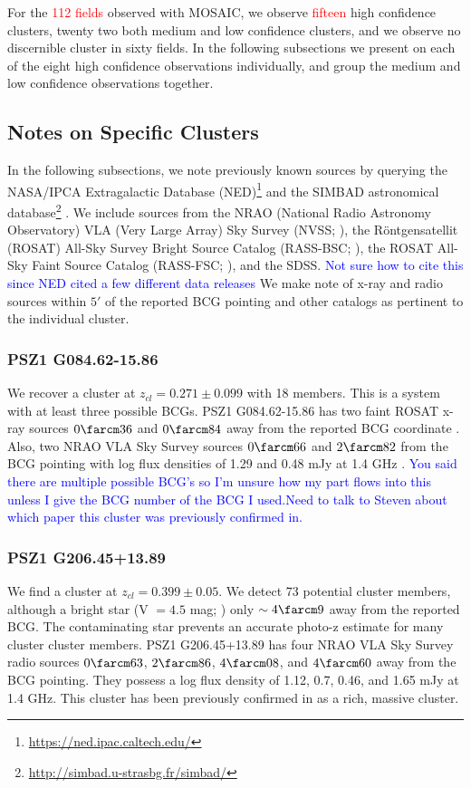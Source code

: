 \documentclass[apj, revtex4-1]{emulateapj}
\newcommand{\editorial}[1]{\textcolor{red}{#1}}
\newcommand{\peditorial}[1]{\textcolor{blue}{#1}}
\begin{document}
For the \editorial{112 fields} observed with MOSAIC, we observe \editorial{fifteen} high confidence clusters, twenty two both medium and low confidence clusters, and we observe no discernible cluster in sixty fields. In the following subsections we present on each of the eight high confidence observations individually, and group the medium and low confidence observations together.

\subsection{Notes on Specific Clusters}
In the following subsections, we note previously known sources by querying the NASA/IPCA Extragalactic Database (NED)\footnote{\url{https://ned.ipac.caltech.edu/}} and the SIMBAD astronomical database\footnote{\url{http://simbad.u-strasbg.fr/simbad/}} \citep{Wenger2000}. We include sources from the NRAO (National Radio
Astronomy Observatory) VLA (Very Large Array) Sky Survey (NVSS; \citealt{Condon1998}), the R\"{o}ntgensatellit (ROSAT) All-Sky Survey Bright Source Catalog (RASS-BSC; \citealt{Voges1999a}), the ROSAT All-Sky Faint Source Catalog (RASS-FSC; \citealt{Voges2000}), and the SDSS. \peditorial{Not sure how to cite this since NED cited a few different data releases} We make note of x-ray and radio sources within $5'$ of the reported BCG pointing and other catalogs as pertinent to the individual cluster.

\subsubsection{PSZ1 G084.62-15.86}
We recover a cluster at $z_{cl} = 0.271 \pm 0.099$ with 18 members. This is a system with at least three possible BCGs. PSZ1 G084.62-15.86 has two faint ROSAT x-ray sources $0\farcm36$ and $0\farcm84$ away from the reported BCG coordinate \citep{Voges2000}. Also, two NRAO VLA Sky Survey sources $0\farcm66$ and $2\farcm82$ from the BCG pointing with log flux densities of 1.29 and 0.48 mJy at 1.4 GHz \citep{Condon1998}. \peditorial{You said there are multiple possible BCG's so I'm unsure how my part flows into this unless I give the BCG number of the BCG I used.}\peditorial{Need to talk to Steven about which paper this cluster was previously confirmed in.}

\subsubsection{PSZ1 G206.45+13.89}
We find a cluster at $z_{cl} = 0.399 \pm 0.05$. We detect 73 potential cluster members, although a bright star (V $= 4.5$ mag; \citealt{Hog2000}) only $\sim4\farcm9$ away from the reported BCG. The contaminating star prevents an accurate photo-z estimate for many cluster cluster members. PSZ1 G206.45+13.89 has four NRAO VLA Sky Survey radio sources $0\farcm63$, $2\farcm86$, $4\farcm08$, and $4\farcm60$ away from the BCG pointing. They possess a log flux density of 1.12, 0.7, 0.46, and 1.65 mJy at 1.4 GHz. This cluster has been previously confirmed in \citep{Barrena2018} as a rich, massive cluster. 
\end{document}

